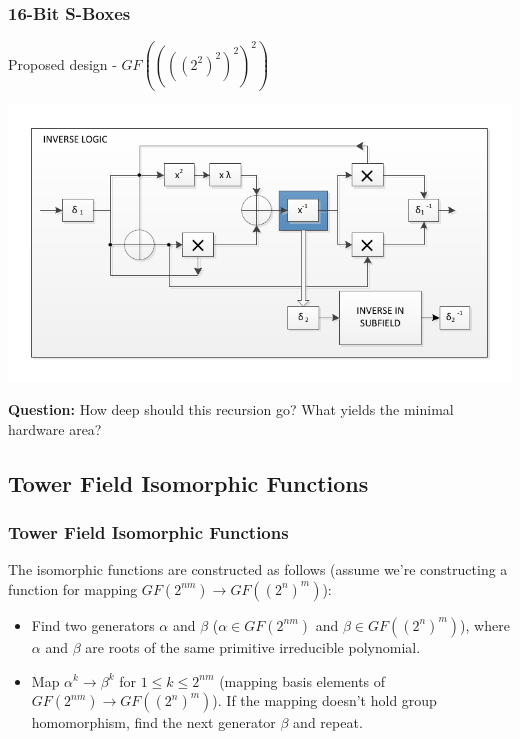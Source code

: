 \documentclass[handout]{beamer}
\begin{document}
\begin{frame}
	\frametitle{16-Bit S-Boxes}
	Proposed design - $GF((((2^2)^2)^2)^2)$
	\begin{center}
	\includegraphics[scale=0.65]{./images/composite_field_inverter.pdf}
	\end{center}
	\textbf{Question:} How deep should this recursion go? What yields the minimal hardware area?
\end{frame}

\subsection{Tower Field Isomorphic Functions}
\begin{frame}
\frametitle{Tower Field Isomorphic Functions}
The isomorphic functions are constructed as follows (assume we're constructing a function for mapping $GF(2^{nm}) \to GF((2^n)^m)$):
\begin{itemize}
	\item Find two generators $\alpha$ and $\beta$ ($\alpha \in GF(2^{nm})$ and $\beta \in GF((2^n)^m)$), where $\alpha$ and $\beta$ are roots of the same primitive irreducible polynomial. 
	\item Map $\alpha^k \to \beta^k$ for $1 \leq k \leq 2^{nm}$ (mapping basis elements of $GF(2^{nm}) \to GF((2^n)^m)$). If the mapping doesn't hold group homomorphism, find the next generator $\beta$ and repeat.
\end{itemize}
\end{frame}
\end{document}
